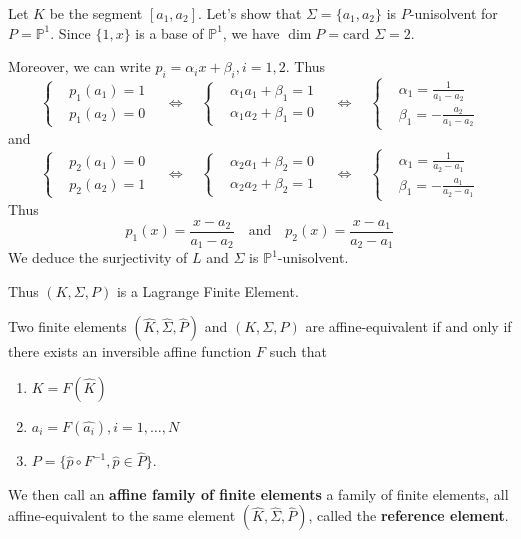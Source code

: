 \begin{Example}
	Let $K$ be the segment $[a_1,a_2]$. Let's show that $\Sigma=\{a_1,a_2\}$ is $P$-unisolvent for $P=\mathbb{P}^1$. Since $\{1,x\}$ is a base of $\mathbb{P}^1$, we have $\dim P = \text{card } \Sigma = 2$. 
	
	Moreover, we can write $p_i=\alpha_i x+\beta_i, i=1,2$. Thus
	\begin{equation*}
		\left\{\begin{aligned}
			&p_1(a_1)=1 \\
			&p_1(a_2)=0
		\end{aligned}\right. \quad \iff	\quad
		\left\{\begin{aligned}
			&\alpha_1 a_1+\beta_1=1 \\
			&\alpha_1 a_2+\beta_1=0
		\end{aligned}\right. \quad \iff \quad
		\left\{\begin{aligned}
		&\alpha_1 = \frac{1}{a_1-a_2} \\
		&\beta_1 = -\frac{a_2}{a_1-a_2}
	\end{aligned}\right.
	\end{equation*}
	and
	\begin{equation*}
		\left\{\begin{aligned}
			&p_2(a_1)=0 \\
			&p_2(a_2)=1
		\end{aligned}\right. \quad \iff	\quad
		\left\{\begin{aligned}
			&\alpha_2 a_1+\beta_2=0 \\
			&\alpha_2 a_2+\beta_2=1
		\end{aligned}\right. \quad \iff \quad
		\left\{\begin{aligned}
			&\alpha_1 = \frac{1}{a_2-a_1} \\
			&\beta_1 = -\frac{a_1}{a_2-a_1}
		\end{aligned}\right.
	\end{equation*}
	Thus
	\begin{equation*}
		p_1(x)=\frac{x-a_2}{a_1-a_2} \quad \text{and} \quad p_2(x)=\frac{x-a_1}{a_2-a_1}
	\end{equation*}
	We deduce the surjectivity of $L$ and $\Sigma$ is $\mathbb{P}^1$-unisolvent. 
	
	Thus $(K,\Sigma,P)$ is a Lagrange Finite Element.
	\end{Example}

	\begin{Def}
		Two finite elements $(\hat{K},\hat{\Sigma},\hat{P})$ and $(K,\Sigma,P)$ are affine-equivalent if and only if there exists an inversible affine function $F$ such that
		\begin{enumerate}[label=\textbullet]
			\item $K=F(\hat{K})$
			\item $a_i=F(\hat{a_i}),i=1,\dots,N$ 
			\item $P=\{\hat{p}\circ F^{-1},\hat{p}\in\hat{P}\}$.
		\end{enumerate}
		We then call an \textbf{affine family of finite elements} a family of finite elements, all affine-equivalent to the same element $(\hat{K},\hat{\Sigma},\hat{P})$, called the \textbf{reference element}.
	\end{Def}

